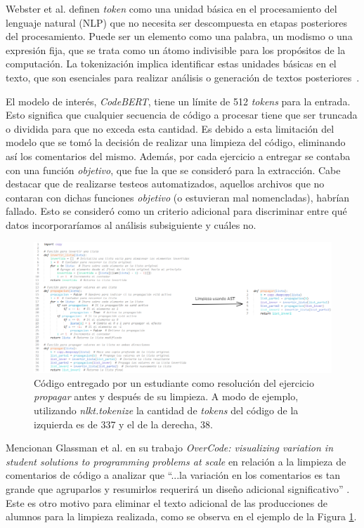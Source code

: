 \documentclass[11pt,a4paper,twoside,openany]{tesis}
\begin{document}
Webster et al. definen \emph{token} como una unidad básica en el procesamiento del lenguaje natural (NLP) que no necesita ser descompuesta en etapas posteriores del procesamiento. Puede ser un elemento como una palabra, un modismo o una expresión fija, que se trata como un átomo indivisible para los propósitos de la computación. La tokenización implica identificar estas unidades básicas en el texto, que son esenciales para realizar análisis o generación de textos posteriores~\cite{tokens}.

El modelo de interés, \emph{CodeBERT}, tiene un límite de 512 \emph{tokens} para la entrada. Esto significa que cualquier secuencia de código a procesar tiene que ser truncada o dividida para que no exceda esta cantidad. Es debido a esta limitación del modelo que se tomó la decisión de realizar una limpieza del código, eliminando así los comentarios del mismo. Además, por cada ejercicio a entregar se contaba con una función \emph{objetivo}, que fue la que se consideró para la extracción. Cabe destacar que de realizarse testeos automatizados, aquellos archivos que no contaran con dichas funciones \emph{objetivo} (o estuvieran mal nomencladas), habrían fallado. Esto se consideró como un criterio adicional para discriminar entre qué datos incorporaríamos al análisis subsiguiente y cuáles no. 

\begin{figure}[H]
    \centering
    \includegraphics[width=1\textwidth]{imagenes/ast.PNG}
    \caption{Código entregado por un estudiante como resolución del ejercicio \emph{propagar} antes y después de su limpieza. A modo de ejemplo, utilizando \emph{nlkt.tokenize} la cantidad de \emph{tokens} del código de la izquierda es de 337 y el de la derecha, 38.}
      \label{limpieza}
\end{figure}

Mencionan Glassman et al. en su trabajo \emph{OverCode: visualizing variation in student solutions to programming problems at scale} \cite{overcode} en relación a la limpieza de comentarios de código a analizar que ``...la variación en los comentarios es tan grande que agruparlos y resumirlos requerirá un diseño adicional significativo'' . Este es otro motivo para eliminar el texto adicional de las producciones de alumnos para la limpieza realizada, como se observa en el ejemplo de la Figura \ref{limpieza}.
\end{document}

